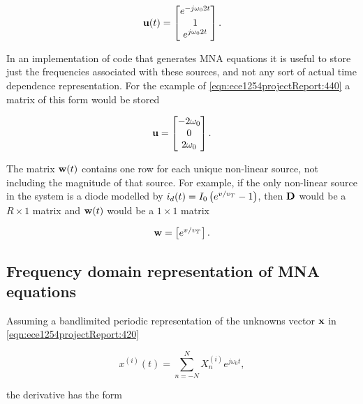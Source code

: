 \documentclass[12pt,journal,compsoc]{../ieeepaper/IEEEtran}
\begin{document}
\begin{equation}\label{eqn:ece1254projectReport:440}
\Bu(t) = 
\begin{bmatrix}
e^{ -j \omega_0 2 t } \\
1 \\
e^{ j \omega_0 2 t }
\end{bmatrix}.
\end{equation}

In an implementation of code that generates MNA equations it is useful to store just the frequencies associated with these sources, and not any sort of actual time dependence representation.  For the example of \cref{eqn:ece1254projectReport:440} a matrix of this form would be stored

\begin{equation}\label{eqn:ece1254projectReport:460}
\Bu =
\begin{bmatrix}
- 2 \omega_0 \\
0 \\
2 \omega_0 
\end{bmatrix}.
\end{equation}

The matrix \( \mathbf{w}(t) \) contains one row for each unique non-linear source, not including the magnitude of that source.  For example, if the only non-linear source in the system is a diode modelled by \( i_d(t) = I_0 \left( e^{ v/v_T} - 1 \right) \), then \( \mathbf{D} \) would be a \( R \times 1 \) matrix and \( \mathbf{w}(t) \) would be a \( 1 \times 1 \) matrix

\begin{equation}\label{eqn:ece1254projectReport:480}
\Bw =
\begin{bmatrix}
e^{ v/v_T }
\end{bmatrix}.
\end{equation}

\subsection{Frequency domain representation of MNA equations}

Assuming a bandlimited periodic representation of the unknowns vector \( \mathbf{x} \) in \cref{eqn:ece1254projectReport:420}

\begin{equation}\label{eqn:ece1254projectReport:500}
x^{(i)}(t) = \sum_{n=-N}^N X_n^{(i)} e^{j \omega_0 t},
\end{equation}

the derivative has the form
\end{document}
